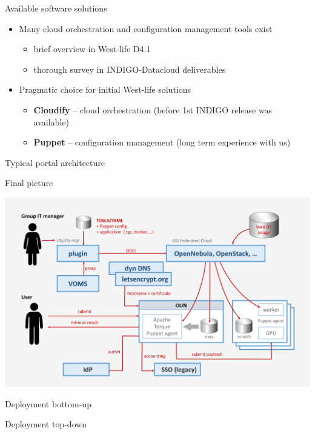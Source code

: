 \documentclass[smaller,t]{beamer}
\begin{document}
\begin{frame}{Available software solutions}
\begin{itemize}
\item Many cloud orchestration and configuration management tools exist
\begin{itemize}
\item brief overview in West-life D4.1
\item thorough survey in INDIGO-Datacloud deliverables
\end{itemize}
\item Pragmatic choice for initial West-life solutions
\begin{itemize}
\item \textbf{Cloudify} -- cloud orchestration (before 1st INDIGO release was available)
\item \textbf{Puppet} -- configuration management (long term experience with us) 
\end{itemize}
\end{itemize}
\end{frame}

\begin{frame}{Typical portal architecture}

\end{frame}

\begin{frame}{Final picture}
\begin{center}
\includegraphics[width=.9\hsize]{P_virt.jpg}
\end{center}
\end{frame}

\begin{frame}{Deployment bottom-up}

\end{frame}

\begin{frame}{Deployment top-down}

\end{frame}
\end{document}
